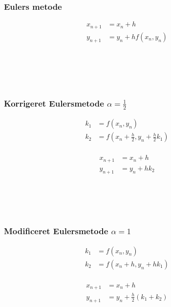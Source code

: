 %
\begin{frame}
\frametitle{Eulers metode } 
\begin{minipage}[b]{0.31\textwidth}
\begin{align*}
x_{n+1} & = x_n+h \\
y_{n+1} & = y_n + h f(x_n,y_n) \\
\phantom{x_1}\\
\\
\\
\end{align*}
\end{minipage}
\phantom{hejmeddig}
%

\\
\phantom{H}
\\
%
\end{frame}
%
%
%
%
\begin{frame}
\frametitle{Korrigeret Eulersmetode $\alpha = \frac{1}{2}$ } 
\begin{minipage}[t]{0.31\textwidth}
\begin{align*}
k_1 & = f(x_n , y_n) \\
k_2 & = f \left( x_n + \frac{h}{2} , y_n + \frac{h}{2} k_1 \right)  \\
\end{align*}
\end{minipage} 
\phantom{Hej}
\begin{minipage}[t]{0.31\textwidth}
\begin{align*}
x_{n+1} & = x_n+h \\
y_{n+1} & = y_n + h k_2 \\
\end{align*}
\end{minipage} 
\\
%

\\
\phantom{H}
\\
%
\end{frame}
%
%
%
\begin{frame}
\frametitle{Modificeret Eulersmetode $\alpha = 1$}  
\begin{minipage}[t]{0.31\textwidth}
\begin{align*}
k_1 & = f(x_n , y_n) \\
k_2 & = f( x_n + h , y_n  + h k_1 ) \\
\end{align*}
%
\end{minipage} 
\phantom{Hej}
\begin{minipage}[t]{0.31\textwidth}
\begin{align*}
x_{n+1} & = x_n+h \\
y_{n+1} & = y_n + \frac{h}{2} (k_1 + k_2 ) \\
\end{align*}
%
\end{minipage} 
\\

\\
\phantom{H}
\\
%
\end{frame}
